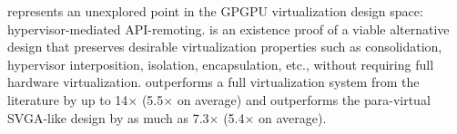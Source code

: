 \Trillium represents an unexplored point in the GPGPU virtualization design space:
hypervisor-mediated API-remoting.
\Trillium is an existence proof of a viable alternative design that preserves desirable
virtualization properties such as consolidation, hypervisor interposition, isolation,
encapsulation, etc., without requiring full hardware virtualization.
\Trillium outperforms a full virtualization system from the literature
by up to 14$\times$ (5.5$\times$ on average) and outperforms the para-virtual
SVGA-like design by as much as 7.3$\times$ (5.4$\times$ on average).





